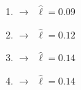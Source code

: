 \documentclass[8pt]{beamer} %
\begin{document}
\begin{frame}
\begin{columns}
\begin{enumerate}\setlength\itemsep{3mm}
\small
\item {} \: $\to$\, $\hat{\ell}=0.09$\\[4mm]
\item<5->  \: $\to$\, $\hat{\ell}=0.12$\\[4mm]
\item<9->  \: $\to$\, $\hat{\ell}=0.14$\\[4mm]
\item<13->  \: $\to$\, $\hat{\ell}=0.14$\\[4mm]
\end{enumerate}


\end{columns}
\end{frame}
\end{document}
